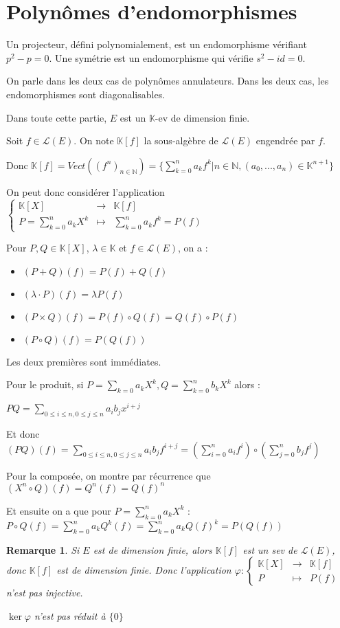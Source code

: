 \documentclass[a4paper,12pt]{book}
\newcommand{\Def}[2]{\begin{tcolorbox}[sharp corners, colback=white,colframe=blue!90!black!75, title=Définition : #1]#2\end{tcolorbox}}
\newcommand{\Prop}[2]{\begin{tcolorbox}[sharp corners, colback=white,colframe=red!90!black!75, title=Proposition : #1]#2\end{tcolorbox}}
\newcommand{\Pre}[1]{\begin{tcolorbox}[sharp corners, colback=white,colframe=green!60!green!30!black!75, title=Preuve]#1\end{tcolorbox}}
\newtheorem{Rem}{Remarque}[section]
\def\N{\mathbb{N}}
\def\K{\mathbb{K}}
\begin{document}
\section{Polynômes d'endomorphismes}
Un projecteur, défini polynomialement, est un endomorphisme vérifiant $p^2-p=0$. Une symétrie est un endomorphisme qui vérifie $s^2-id=0$. \par On parle dans les deux cas de polynômes annulateurs. Dans les deux cas, les endomorphismes sont diagonalisables.
\par Dans toute cette partie, $E$ est un $\K$-ev de dimension finie.
\Def{Polynôme d'endomorphismes}{Soit $f\in\mathcal{L}(E)$. On note $\K[f]$ la sous-algèbre de $\mathcal{L}(E)$ engendrée par $f$.\par Donc $\K[f] = Vect((f^n)_{n\in\N})=\{\sum\limits_{k=0}^na_kf^k|n\in\N, (a_0,...,a_n)\in\K^{n+1}\}$
\par On peut donc considérer l'application $\left\{\begin{array}{rcl} \K[X] & \to & \K[f] \\ P = \sum\limits_{k=0}^na_kX^k & \mapsto & \sum\limits_{k=0}^na_kf^k = P(f)\end{array}\right.$}
\Prop{Opérations sur les polynômes d'endomorphismes}{Pour $P,Q\in\K[X]$, $\lambda\in\K$ et $f\in\mathcal{L}(E)$, on a :\begin{itemize}
\item $(P+Q)(f) = P(f) + Q(f)$
\item $(\lambda\cdot P)(f) = \lambda P(f)$
\item $(P\times Q)(f) = P(f)\circ Q(f)=Q(f)\circ P(f)$
\item $(P\circ Q)(f) = P(Q(f))$
\end{itemize}}
\Pre{Les deux premières sont immédiates. \par Pour le produit, si $P=\sum\limits_{k=0}a_kX^k, Q=\sum\limits_{k=0}^nb_kX^k$ alors : \par $PQ=\sum\limits_{0\leq i\leq n, 0\leq j\leq n} a_ib_jx^{i+j}$ \par Et donc $(PQ)(f) = \sum\limits_{0\leq i\leq n,0\leq j\leq n} a_ib_jf^{i+j} = \left(\sum\limits_{i=0}^na_if^i\right)\circ\left(\sum\limits_{j=0}^nb_jf^j\right)$
\par Pour la composée, on montre par récurrence que $(X^n\circ Q)(f) = Q^n(f) = Q(f)^n$ \par Et ensuite on a que pour $P=\sum\limits_{k=0}^na_kX^k$ : $P\circ Q(f) = \sum\limits_{k=0}^na_kQ^k(f) = \sum\limits_{k=0}^na_kQ(f)^k = P(Q(f))$}
\begin{Rem}
Si $E$ est de dimension finie, alors $\K[f]$ est un sev de $\mathcal{L}(E)$, donc $\K[f]$ est de dimension finie. Donc l'application $\varphi:\left\{\begin{array}{rcl} \K[X] & \to & \K[f] \\ P & \mapsto & P(f)\end{array}\right.$ n'est pas injective. \par $\ker\varphi$ n'est pas réduit à $\{0\}$
\end{Rem}
\end{document}
